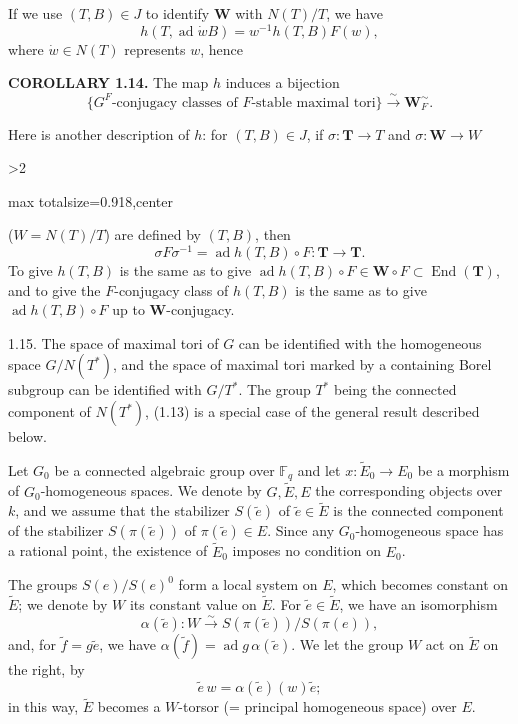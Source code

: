 \documentclass[9pt,twoside]{extarticle}
\newcommand{\EditionPage}[3]{%
  \ifnum#1>2\clearpage\fi
  \pdfbookmark[1]{Printed page #2}{en-folio-#2}%
  \hypertarget{en-physical-#1}{}%
  \noindent\begin{adjustbox}{max totalsize={\textwidth}{0.918\textheight},center}
  \begin{minipage}[t]{\textwidth}
  \fontsize{9.4}{11.1}\selectfont\justifying
  #3
  \end{minipage}
  \end{adjustbox}%
}
\begin{document}
{If we use \((T,B)\in J\) to identify \(\mathbf W\) with \(N(T)/T\), we have \[
\tag{1.13.1}
h(T,\operatorname{ad}\dot wB)=w^{-1}h(T,B)F(w),
\] where \(\dot w\in N(T)\) represents \(w\), hence\par

\noindent\textbf{COROLLARY 1.14.} The map \(h\) induces a bijection \[
\{G^F\text{-conjugacy classes of }F\text{-stable maximal tori}\}\xrightarrow{\sim}\mathbf W_F^{\sim}.
\]\par

Here is another description of \(h\): for \((T,B)\in J\), if \(\sigma:\mathbf T\to T\) and \(\sigma:\mathbf W\to W\)\par
}

\EditionPage{12}{113}{%
(\(W=N(T)/T\)) are defined by \((T,B)\), then \[
\sigma F\sigma^{-1}=\operatorname{ad}h(T,B)\circ F:\mathbf T\longrightarrow\mathbf T.
\] To give \(h(T,B)\) is the same as to give \(\operatorname{ad}h(T,B)\circ F\in\mathbf W\circ F\subset\operatorname{End}(\mathbf T)\), and to give the \(F\)-conjugacy class of \(h(T,B)\) is the same as to give \(\operatorname{ad}h(T,B)\circ F\) up to \(\mathbf W\)-conjugacy.\par

1.15. The space of maximal tori of \(G\) can be identified with the homogeneous space \(G/N(T^*)\), and the space of maximal tori marked by a containing Borel subgroup can be identified with \(G/T^*\). The group \(T^*\) being the connected component of \(N(T^*)\), (1.13) is a special case of the general result described below.\par

Let \(G_0\) be a connected algebraic group over \(\mathbb F_q\) and let \(x:\widetilde E_0\to E_0\) be a morphism of \(G_0\)-homogeneous spaces. We denote by \(G,\widetilde E,E\) the corresponding objects over \(k\), and we assume that the stabilizer \(S(\widetilde e)\) of \(\widetilde e\in\widetilde E\) is the connected component of the stabilizer \(S(\pi(\widetilde e))\) of \(\pi(\widetilde e)\in E\). Since any \(G_0\)-homogeneous space has a rational point, the existence of \(\widetilde E_0\) imposes no condition on \(E_0\).\par

The groups \(S(e)/S(e)^0\) form a local system on \(E\), which becomes constant on \(\widetilde E\); we denote by \(W\) its constant value on \(\widetilde E\). For \(\widetilde e\in\widetilde E\), we have an isomorphism \[
\alpha(\widetilde e):W\xrightarrow{\sim}S(\pi(\widetilde e))/S(\pi(e)),
\] and, for \(\widetilde f=g\widetilde e\), we have \(\alpha(\widetilde f)=\operatorname{ad}g\,\alpha(\widetilde e)\). We let the group \(W\) act on \(\widetilde E\) on the right, by \[
\widetilde e\,w=\alpha(\widetilde e)(w)\widetilde e;
\] in this way, \(\widetilde E\) becomes a \(W\)-torsor (= principal homogeneous space) over \(E\).\par

}
\end{document}
